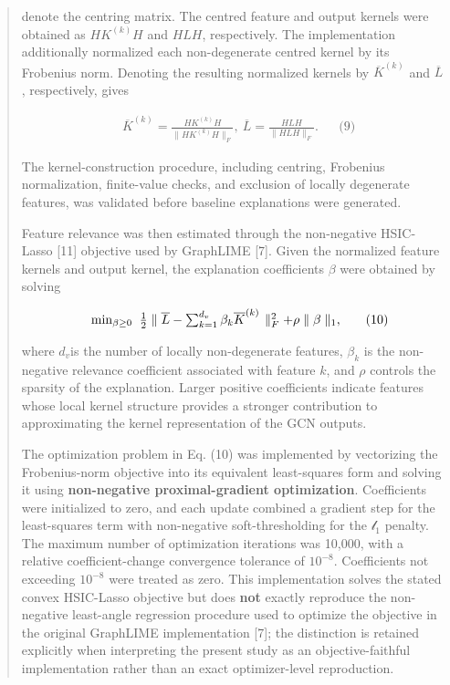 \documentclass[a4paper]{article}
\begin{document}
\begin{quote}
denote the centring matrix. The centred feature and output kernels were
obtained as \(HK^{(k)}H\) and \(HLH\), respectively. The implementation
additionally normalized each non-degenerate centred kernel by its
Frobenius norm. Denoting the resulting normalized kernels by
\({\overline{K}}^{(k)}\) and \(\overline{L}\), respectively, gives

\[\begin{matrix}
 & {\overline{K}}^{(k)} = \frac{HK^{(k)}H}{\left. \parallel HK^{(k)}H \right.\parallel_{F}},\ \overline{L} = \frac{HLH}{\left. \parallel HLH \right.\parallel_{F}}. & & \text{(9)}
\end{matrix}
\]

The kernel-construction procedure, including centring, Frobenius
normalization, finite-value checks, and exclusion of locally degenerate
features, was validated before baseline explanations were generated.

Feature relevance was then estimated through the non-negative HSIC-Lasso
{[}11{]} objective used by GraphLIME {[}7{]}. Given the normalized
feature kernels and output kernel, the explanation coefficients
\(\beta\) were obtained by solving

\[\begin{matrix}
 & \min_{\beta \geq 0}\text{\:\,}\frac{1}{2}\left. \parallel\overline{L} - \sum_{k = 1}^{d_{v}}\beta_{k}{\overline{K}}^{(k)} \right.\parallel_{F}^{2} + \rho \parallel \beta \parallel_{1}, & & \text{(10)}
\end{matrix}
\]

where \(d_{v}\)is the number of locally non-degenerate features,
\(\beta_{k}\) is the non-negative relevance coefficient associated with
feature \(k\), and \(\rho\) controls the sparsity of the explanation.
Larger positive coefficients indicate features whose local kernel
structure provides a stronger contribution to approximating the kernel
representation of the GCN outputs.

The optimization problem in Eq. (10) was implemented by vectorizing the
Frobenius-norm objective into its equivalent least-squares form and
solving it using \textbf{non-negative proximal-gradient optimization}.
Coefficients were initialized to zero, and each update combined a
gradient step for the least-squares term with non-negative
soft-thresholding for the \(\mathcal{l}_{1}\) penalty. The maximum
number of optimization iterations was 10,000, with a relative
coefficient-change convergence tolerance of \(10^{- 8}\). Coefficients
not exceeding \(10^{- 8}\) were treated as zero. This implementation
solves the stated convex HSIC-Lasso objective but does \textbf{not}
exactly reproduce the non-negative least-angle regression procedure used
to optimize the objective in the original GraphLIME implementation
{[}7{]}; the distinction is retained explicitly when interpreting the
present study as an objective-faithful implementation rather than an
exact optimizer-level reproduction.


\end{quote}
\end{document}
